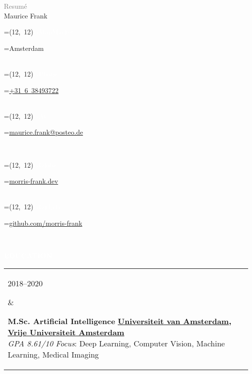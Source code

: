 \documentclass{article}
\newcommand{\vcenteredhbox}[1]{%
	\begingroup%
		\setbox0=\hbox{#1}\parbox{\wd0}{\box0}%
	\endgroup%
}
\newcommand{\icon}[3]{%
	\vcenteredhbox{\colorbox{primary}{\makebox(#2, #2){\textcolor{white}{\large\csname fa#1\endcsname}}}}%
	\hspace{0.2cm}%
	\vcenteredhbox{\textcolor{primary}{#3}}%
}
\newcommand{\cvsect}[1]{
	\vspace{\baselineskip}
	\colorbox{primary}{\textcolor{white}{\MakeUppercase{\textbf{#1}}}}\\
}
\newenvironment{entrylist}{
	\begin{longtable}[H]{l l}
}{
	\end{longtable}
}
\newcommand{\entry}[4]{%
	\parbox[t]{0.175\linewidth}{#1} &
	\parbox[t]{0.825\linewidth}{
		\textbf{#2}%
		\hfill%
		{\footnotesize \textbf{\textcolor{black}{#3}}}\\%
		{\small #4} %
    }\\\\}
\begin{document}
\begin{minipage}[t]{0.4\textwidth}
    \vspace{-\baselineskip}
    {\LARGE\textcolor{gray}{Resumé}}\\

    {\Huge Maurice Frank}
\end{minipage}
\begin{cvbox}
	\icon{MapMarker}{12}{Amsterdam}\\
	\icon{Phone}{12}{\href{tel:0031638493722}{+31 6 38493722}}\\
	\icon{At}{12}{\href{mailto:maurice.frank@posteo.de}{maurice.frank@posteo.de}}\\
\end{cvbox}
\begin{cvbox}
	\icon{Globe}{12}{\href{https://morris-frank.dev}{morris-frank.dev}}\\
	\icon{Github}{12}{\href{https://github.com/morris-frank}{github.com/morris-frank}}\\
\end{cvbox}

\cvsect{Education}
\begin{entrylist}
    \entry{2018--2020}
    {M.Sc. Artificial Intelligence}
    {\href{https://uva.nl}{Universiteit van Amsterdam}, \href{https://vu.nl}{Vrije Universiteit Amsterdam}}
    {\textit{GPA 8.61/10} \quad \textit{Focus}: Deep Learning, Computer Vision, Machine Learning, Medical Imaging}

    \entry{2014--2017}
    {B.Sc. Applied Computer Science}
    {\href{https://www.uni-heidelberg.de/en}{University Heidelberg}}
    {\textit{GPA 3.48/4}\ \ \quad \textit{Focus}: Image processing and pattern recognition}

    \entry{2013--2014}
    {B.Sc. Physics}
    {\href{https://www.uni-heidelberg.de/en}{University Heidelberg}}
    {Change of degree after the second semester}

    \entry{2005--2013}
    {A levels}
    {\href{http://www.mpg-online.de/}{Max-Planck Gymnasium, Schorndorf}}
    {\textit{GPA B-}}
\end{entrylist}
\end{document}
